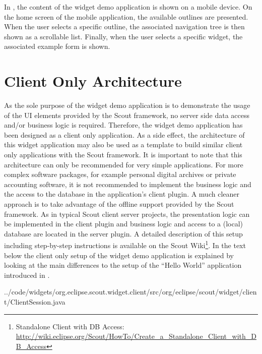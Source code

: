 \documentclass[a4paper,10pt,twoside]{book}
\begin{document}
{In , the content of the widget demo application is shown on a mobile device. 
On the home screen of the mobile application, the available outlines are presented. 
When the user selects a specific outline, the associated navigation tree is then shown as a scrollable list. 
Finally, when the user selects a specific widget, the associated example form is shown. 

\section{Client Only Architecture}

As the sole purpose of the widget demo application is to demonstrate the usage of the UI elements provided by the Scout framework, no server side data access and/or business logic is required. 
Therefore, the widget demo application has been designed as a client only application. 
As a side effect, the architecture of this widget application may also be used as a template to build similar client only applications with the Scout framework. 
It is important to note that this architecture can only be recommended for very simple applications. 
For more complex software packages, for example personal digital archives or private accounting software, it is not recommended to implement the business logic and the access to the database in the application's client plugin. 
A much cleaner approach is to take advantage of the offline support provided by the Scout framework. 
As in typical Scout client server projects, the presentation logic can be implemented in the client plugin and business logic and access to a (local) database are located in the server plugin. 
A detailed description of this setup including step-by-step instructions is available on the Scout Wiki\footnote{
Standalone Client with DB Access: \url{http://wiki.eclipse.org/Scout/HowTo/Create_a_Standalone_Client_with_DB_Access}
}.
In the text below the client only setup of the widget demo application is explained by looking at the main differences to the setup of the ``Hello World'' application introduced in . 


{../code/widgets/org.eclipse.scout.widget.client/src/org/eclipse/scout/widget/client/ClientSession.java}

}
\end{document}
